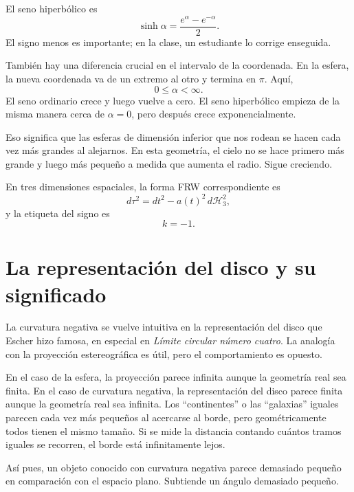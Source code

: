 El seno hiperbólico es
\begin{equation}
\sinh\alpha=\frac{e^\alpha-e^{-\alpha}}{2}.
\end{equation}
El signo menos es importante; en la clase, un estudiante lo corrige enseguida.

También hay una diferencia crucial en el intervalo de la coordenada. En la esfera, la nueva coordenada va de un extremo al otro y termina en \(\pi\). Aquí,
\begin{equation}
0\leq \alpha<\infty.
\end{equation}
El seno ordinario crece y luego vuelve a cero. El seno hiperbólico empieza de la misma manera cerca de \(\alpha=0\), pero después crece exponencialmente.

Eso significa que las esferas de dimensión inferior que nos rodean se hacen cada vez más grandes al alejarnos. En esta geometría, el cielo no se hace primero más grande y luego más pequeño a medida que aumenta el radio. Sigue creciendo.

En tres dimensiones espaciales, la forma FRW correspondiente es
\begin{equation}
d\tau^2=dt^2-a(t)^2\,d\mathcal H_3^2,
\end{equation}
y la etiqueta del signo es
\begin{equation}
k=-1.
\end{equation}

\section{La representación del disco y su significado}

La curvatura negativa se vuelve intuitiva en la representación del disco que Escher hizo famosa, en especial en \emph{Límite circular número cuatro}. La analogía con la proyección estereográfica es útil, pero el comportamiento es opuesto.

En el caso de la esfera, la proyección parece infinita aunque la geometría real sea finita. En el caso de curvatura negativa, la representación del disco parece finita aunque la geometría real sea infinita. Los ``continentes'' o las ``galaxias'' iguales parecen cada vez más pequeños al acercarse al borde, pero geométricamente todos tienen el mismo tamaño. Si se mide la distancia contando cuántos tramos iguales se recorren, el borde está infinitamente lejos.

Así pues, un objeto conocido con curvatura negativa parece demasiado pequeño en comparación con el espacio plano. Subtiende un ángulo demasiado pequeño.


